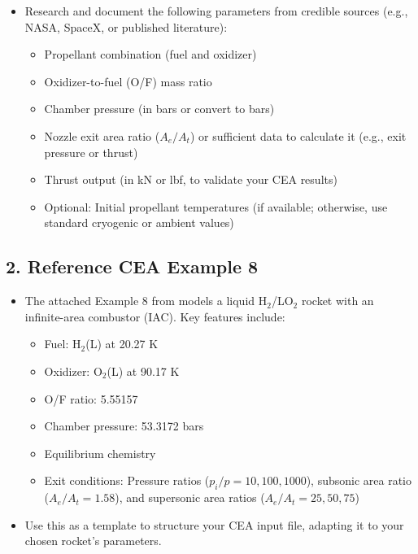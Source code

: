 \documentclass[12pt]{article}
\begin{document}
\begin{itemize}
    \item Research and document the following parameters from credible sources (e.g., NASA, SpaceX, or published literature):
    \begin{itemize}
        \item Propellant combination (fuel and oxidizer)
        \item Oxidizer-to-fuel (O/F) mass ratio
        \item Chamber pressure (in bars or convert to bars)
        \item Nozzle exit area ratio ($A_e/A_t$) or sufficient data to calculate it (e.g., exit pressure or thrust)
        \item Thrust output (in kN or lbf, to validate your CEA results)
        \item Optional: Initial propellant temperatures (if available; otherwise, use standard cryogenic or ambient values)
    \end{itemize}
\end{itemize}

\subsection{2. Reference CEA Example 8}
\begin{itemize}
    \item The attached Example 8 from \cite{cea_example} models a liquid H$_2$/LO$_2$ rocket with an infinite-area combustor (IAC). Key features include:
    \begin{itemize}
        \item Fuel: H$_2$(L) at 20.27 K
        \item Oxidizer: O$_2$(L) at 90.17 K
        \item O/F ratio: 5.55157
        \item Chamber pressure: 53.3172 bars
        \item Equilibrium chemistry
        \item Exit conditions: Pressure ratios ($p_i/p = 10, 100, 1000$), subsonic area ratio ($A_e/A_t = 1.58$), and supersonic area ratios ($A_e/A_t = 25, 50, 75$)
    \end{itemize}
    \item Use this as a template to structure your CEA input file, adapting it to your chosen rocket's parameters.
\end{itemize}
\end{document}
